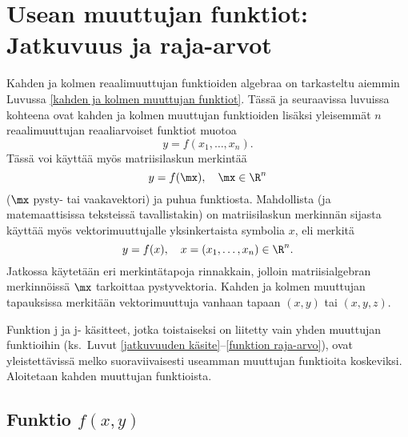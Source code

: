 \section{Usean muuttujan funktiot: Jatkuvuus ja raja-arvot} 
\label{usean muuttujan jatkuvuus}
\alku
{}

Kahden ja kolmen reaalimuuttujan funktioiden algebraa on tarkasteltu aiemmin Luvussa 
\ref{kahden ja kolmen muuttujan funktiot}. Tässä ja seuraavissa luvuissa kohteena ovat kahden
ja kolmen muuttujan funktioiden lisäksi yleisemmät $n$ reaalimuuttujan reaaliarvoiset funktiot 
muotoa
\[
y=f(x_1,\ldots,x_n).
\]
Tässä voi käyttää myös matriisilaskun merkintää
\[
y=f(\mx), \quad \mx\in\R^n
\] 
($\mx$ pysty- tai vaakavektori) ja puhua  funktiosta. Mahdollista
(ja matemaattisissa teksteissä  tavallistakin) on matriisilaskun merkinnän sijasta käyttää myös
vektorimuuttujalle yksinkertaista symbolia $x$, eli merkitä
\[
y=f(x),\quad x=(x_1,\ldots,x_n)\in\R^n.
\]
Jatkossa käytetään eri merkintätapoja rinnakkain, jolloin matriisialgebran merkinnöissä $\mx$ 
tarkoittaa pystyvektoria. Kahden ja kolmen muuttujan tapauksissa merkitään vektorimuuttuja
vanhaan tapaan $(x,y)$ tai $(x,y,z)$. 

Funktion j ja j- käsitteet, jotka toistaiseksi
on liitetty vain yhden muuttujan funktioihin 
(ks.\ Luvut \ref{jatkuvuuden käsite}--\ref{funktion raja-arvo}), ovat yleistettävissä melko
suoraviivaisesti useamman muuttujan funktioita koskeviksi. Aloitetaan kahden muuttujan
funktioista.

\subsection{Funktio $f(x,y)$}


